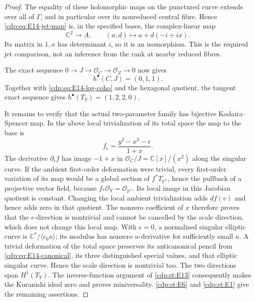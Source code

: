 \begin{proof}
The equality of these holomorphic maps on the punctured curve
extends over all of $\Gamma$, and in particular over its
nonreduced central fibre. Hence \eqref{cdp:eq:E14-jet-map} is,
in the specified bases, the complex-linear map
\[
 \mathbb C^2\longrightarrow A,\qquad
 (a,d)\longmapsto a+d(-i+ix).
\]
Its matrix in $1,x$ has determinant $i$, so it is an isomorphism.
This is the required jet comparison, not an inference from the
rank at nearby reduced fibres.

The exact sequence $0\to J\to\mathcal O_C\to\mathcal O_Z\to0$
now gives
\[
 h^\bullet(C,J)=(0,1,1).
\]
Together with \eqref{cdp:eq:E14-log-coho} and the hexagonal quotient,
the tangent exact sequence gives
$h^\bullet(T_Y)=(1,2,2,0)$.

It remains to verify that the actual two-parameter family has
bijective Kodaira--Spencer map. In the above local trivialization
of its total space the map to the base is
\[
 f_{\epsilon}=\frac{y^2-x^3-\epsilon}{1+x}.
\]
The derivative $\partial_\epsilon f$ has image $-1+x$ in
$\mathcal O_C/J=\mathbb C[x]/(x^2)$ along the singular curve.
If the ambient first-order deformation were trivial, every
first-order variation of its map would be a global section of
$f^*T_{\mathbb P^1}$, hence the pullback of a projective vector
field, because $f_*\mathcal O_Y=\mathcal O_{\mathbb P^1}$.
Its local image in this Jacobian quotient is constant. Changing
the local ambient trivialization adds $df(v)$ and hence adds
zero in that quotient. The nonzero coefficient of $x$ therefore
proves that the $\epsilon$-direction is nontrivial and cannot be
cancelled by the scale direction, which does not change this local
map. With $\epsilon=0$, a normalized singular elliptic curve is
$\mathbb C^*/\langle c_0u\rangle$; its modulus has nonzero
$u$-derivative for sufficiently small $u$. A trivial deformation
of the total space preserves its anticanonical pencil from
\eqref{cdp:eq:E14-canonical}, its three distinguished special values,
and that elliptic singular curve. Hence the scale direction is
nontrivial too. The two directions span $H^1(T_Y)$.
The inverse-function argument of \ref{cdp:st:E13} consequently makes the
Kuranishi ideal zero and proves miniversality. \ref{cdp:st:E6} and \ref{cdp:st:E1} give the
remaining assertions.
\end{proof}


